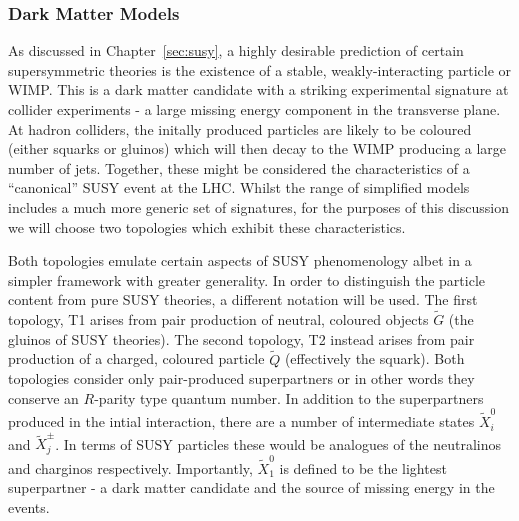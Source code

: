 
\subsubsection{Dark Matter Models}
As discussed in Chapter~\ref{sec:susy}, a highly desirable prediction of certain
supersymmetric theories is the existence of a stable, weakly-interacting
particle or \ac{WIMP}. This is a dark matter candidate with a striking
experimental signature at collider experiments - a large missing energy
component in the transverse plane. At hadron colliders, the initally produced
particles are likely to be coloured (either squarks or gluinos) which will then
decay to the \ac{WIMP} producing a large number of jets. Together, these might
be considered the characteristics of a ``canonical'' \ac{SUSY} event at the
\ac{LHC}. Whilst the range of simplified models includes a much more generic set
of signatures, for the purposes of this discussion we will choose two topologies
which exhibit these characteristics.

Both topologies emulate certain aspects of \ac{SUSY} phenomenology albet in a
simpler framework with greater generality. In order to distinguish the particle
content from pure \ac{SUSY} theories, a different notation will be used. The
first topology, T1 arises from pair production of neutral, coloured objects
$\tilde{G}$ (the gluinos of \ac{SUSY} theories). The second topology, T2 instead
arises from pair production of a charged, coloured particle $\tilde{Q}$
(effectively the squark). Both topologies consider only pair-produced
superpartners or in other words they conserve an $R$-parity type quantum
number. In addition to the superpartners produced in the intial interaction,
there are a number of intermediate states $\tilde{X}^0_i$ and
$\tilde{X}^{\pm}_j$. In terms of \ac{SUSY} particles these would be analogues of
the neutralinos and charginos respectively. Importantly, $\tilde{X}^0_1$ is defined to
be the lightest superpartner - a dark matter candidate and the source of missing
energy in the events.

